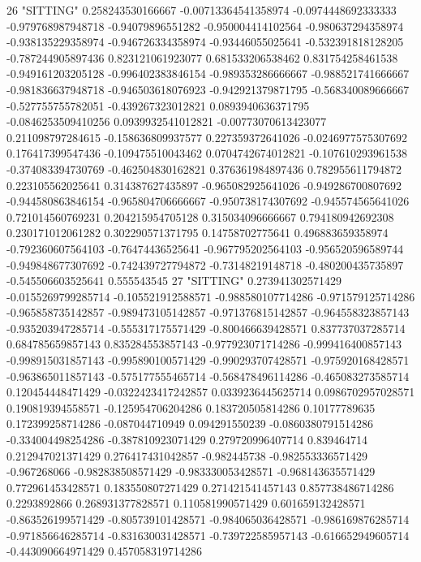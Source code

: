 26 "SITTING" 0.258243530166667 -0.00713364541358974 -0.0974448692333333 -0.979768987948718 -0.94079896551282 -0.950004414102564 -0.980637294358974 -0.938135229358974 -0.946726334358974 -0.93446055025641 -0.532391818128205 -0.787244905897436 0.823121061923077 0.681533206538462 0.831754258461538 -0.949161203205128 -0.996402383846154 -0.989353286666667 -0.988521741666667 -0.981836637948718 -0.946503618076923 -0.942921379871795 -0.568340089666667 -0.527755755782051 -0.439267323012821 0.0893940636371795 -0.0846253509410256 0.0939932541012821 -0.00773070613423077 0.211098797284615 -0.158636809937577 0.227359372641026 -0.0246977575307692 0.176417399547436 -0.109475510043462 0.0704742674012821 -0.107610293961538 -0.374083394730769 -0.462504830162821 0.376361984897436 0.782955611794872 0.223105562025641 0.314387627435897 -0.965082925641026 -0.949286700807692 -0.944580863846154 -0.965804706666667 -0.950738174307692 -0.945574565641026 0.721014560769231 0.204215954705128 0.315034096666667 0.794180942692308 0.230171012061282 0.302290571371795 0.14758702775641 0.496883659358974 -0.792360607564103 -0.76474436525641 -0.967795202564103 -0.956520596589744 -0.949848677307692 -0.742439727794872 -0.73148219148718 -0.480200435735897 -0.545506603525641 0.555543545
27 "SITTING" 0.273941302571429 -0.0155269799285714 -0.105521912588571 -0.988580107714286 -0.971579125714286 -0.965858735142857 -0.989473105142857 -0.971376815142857 -0.964558323857143 -0.935203947285714 -0.555317175571429 -0.800466639428571 0.837737037285714 0.684785659857143 0.835284553857143 -0.977923071714286 -0.999416400857143 -0.998915031857143 -0.995890100571429 -0.990293707428571 -0.975920168428571 -0.963865011857143 -0.575177555465714 -0.568478496114286 -0.465083273585714 0.120454448471429 -0.0322423417242857 0.0339236445625714 0.0986702957028571 0.190819394558571 -0.125954706204286 0.183720505814286 0.10177789635 0.172399258714286 -0.087044710949 0.094291550239 -0.0860380791514286 -0.334004498254286 -0.387810923071429 0.279720996407714 0.839464714 0.212947021371429 0.276417431042857 -0.982445738 -0.982553336571429 -0.967268066 -0.982838508571429 -0.983330053428571 -0.968143635571429 0.772961453428571 0.183550807271429 0.271421541457143 0.857738486714286 0.2293892866 0.268931377828571 0.110581990571429 0.601659132428571 -0.863526199571429 -0.805739101428571 -0.984065036428571 -0.986169876285714 -0.971856646285714 -0.831630031428571 -0.739722585957143 -0.616652949605714 -0.443090664971429 0.457058319714286

